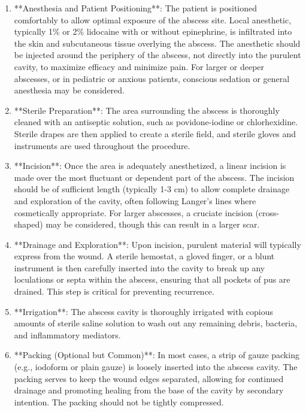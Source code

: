 \begin{enumerate}
  \item **Anesthesia and Patient Positioning**: The patient is positioned comfortably to allow optimal exposure of the abscess site. Local anesthetic, typically 1\% or 2\% lidocaine with or without epinephrine, is infiltrated into the skin and subcutaneous tissue overlying the abscess. The anesthetic should be injected around the periphery of the abscess, not directly into the purulent cavity, to maximize efficacy and minimize pain. For larger or deeper abscesses, or in pediatric or anxious patients, conscious sedation or general anesthesia may be considered.

  \item **Sterile Preparation**: The area surrounding the abscess is thoroughly cleaned with an antiseptic solution, such as povidone-iodine or chlorhexidine. Sterile drapes are then applied to create a sterile field, and sterile gloves and instruments are used throughout the procedure.

  \item **Incision**: Once the area is adequately anesthetized, a linear incision is made over the most fluctuant or dependent part of the abscess. The incision should be of sufficient length (typically 1-3 cm) to allow complete drainage and exploration of the cavity, often following Langer's lines where cosmetically appropriate. For larger abscesses, a cruciate incision (cross-shaped) may be considered, though this can result in a larger scar.

  \item **Drainage and Exploration**: Upon incision, purulent material will typically express from the wound. A sterile hemostat, a gloved finger, or a blunt instrument is then carefully inserted into the cavity to break up any loculations or septa within the abscess, ensuring that all pockets of pus are drained. This step is critical for preventing recurrence.

  \item **Irrigation**: The abscess cavity is thoroughly irrigated with copious amounts of sterile saline solution to wash out any remaining debris, bacteria, and inflammatory mediators.

  \item **Packing (Optional but Common)**: In most cases, a strip of gauze packing (e.g., iodoform or plain gauze) is loosely inserted into the abscess cavity. The packing serves to keep the wound edges separated, allowing for continued drainage and promoting healing from the base of the cavity by secondary intention. The packing should not be tightly compressed.


\end{enumerate}
